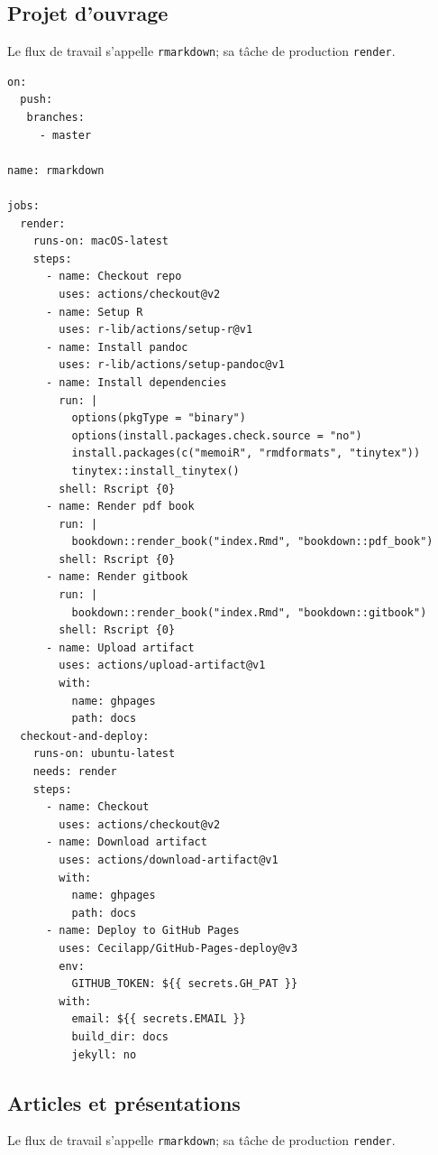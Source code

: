 \documentclass[
  12pt,
  french,
  a4paper,
  extrafontsizes,onecolumn,openright
  ]{memoir}
\begin{document}
\hypertarget{sec:bookdown-ci}{%
\subsection{Projet d'ouvrage}\label{sec:bookdown-ci}}

Le flux de travail s'appelle \texttt{rmarkdown}; sa tâche de production \texttt{render}.

\begin{verbatim}
on:
  push:
   branches:
     - master

name: rmarkdown

jobs:
  render:
    runs-on: macOS-latest
    steps:
      - name: Checkout repo
        uses: actions/checkout@v2
      - name: Setup R
        uses: r-lib/actions/setup-r@v1
      - name: Install pandoc
        uses: r-lib/actions/setup-pandoc@v1
      - name: Install dependencies
        run: |
          options(pkgType = "binary")
          options(install.packages.check.source = "no")
          install.packages(c("memoiR", "rmdformats", "tinytex"))
          tinytex::install_tinytex()
        shell: Rscript {0}
      - name: Render pdf book
        run: |
          bookdown::render_book("index.Rmd", "bookdown::pdf_book")
        shell: Rscript {0}
      - name: Render gitbook
        run: |
          bookdown::render_book("index.Rmd", "bookdown::gitbook")
        shell: Rscript {0}
      - name: Upload artifact
        uses: actions/upload-artifact@v1
        with:
          name: ghpages
          path: docs
  checkout-and-deploy:
    runs-on: ubuntu-latest
    needs: render
    steps:
      - name: Checkout
        uses: actions/checkout@v2
      - name: Download artifact
        uses: actions/download-artifact@v1
        with:
          name: ghpages
          path: docs
      - name: Deploy to GitHub Pages
        uses: Cecilapp/GitHub-Pages-deploy@v3
        env:
          GITHUB_TOKEN: ${{ secrets.GH_PAT }}
        with:
          email: ${{ secrets.EMAIL }}
          build_dir: docs
          jekyll: no
\end{verbatim}

\hypertarget{articles-et-pruxe9sentations}{%
\subsection{Articles et présentations}\label{articles-et-pruxe9sentations}}

Le flux de travail s'appelle \texttt{rmarkdown}; sa tâche de production \texttt{render}.
\end{document}
